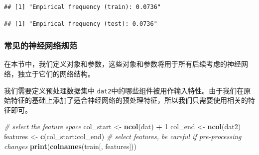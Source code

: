 \documentclass[
]{article}
\newenvironment{Shaded}{\begin{snugshade}}{\end{snugshade}}
\newcommand{\CommentTok}[1]{\textcolor[rgb]{0.56,0.35,0.01}{\textit{#1}}}
\newcommand{\DecValTok}[1]{\textcolor[rgb]{0.00,0.00,0.81}{#1}}
\newcommand{\FunctionTok}[1]{\textcolor[rgb]{0.13,0.29,0.53}{\textbf{#1}}}
\newcommand{\NormalTok}[1]{#1}
\newcommand{\OtherTok}[1]{\textcolor[rgb]{0.56,0.35,0.01}{#1}}
\newcommand{\SpecialCharTok}[1]{\textcolor[rgb]{0.81,0.36,0.00}{\textbf{#1}}}
\newcommand{\StringTok}[1]{\textcolor[rgb]{0.31,0.60,0.02}{#1}}
\begin{document}
\begin{Shaded}
\end{Shaded}

\begin{verbatim}
## [1] "Empirical frequency (train): 0.0736"
\end{verbatim}

\begin{Shaded}
\end{Shaded}

\begin{verbatim}
## [1] "Empirical frequency (test): 0.0736"
\end{verbatim}

\subsubsection{常见的神经网络规范}\label{ux5e38ux89c1ux7684ux795eux7ecfux7f51ux7edcux89c4ux8303}

在本节中，我们定义对象和参数，这些对象和参数将用于所有后续考虑的神经网络，独立于它们的网络结构。

我们需要定义预处理数据集中
\texttt{dat2}中的哪些组件被用作输入特性。由于我们在原始特征的基础上添加了适合神经网络的预处理特征，所以我们只需要使用相关的特征即可。

\begin{Shaded}
\begin{Highlighting}[]
\CommentTok{\# select the feature space}
\NormalTok{col\_start }\OtherTok{\textless{}{-}} \FunctionTok{ncol}\NormalTok{(dat) }\SpecialCharTok{+} \DecValTok{1}
\NormalTok{col\_end }\OtherTok{\textless{}{-}} \FunctionTok{ncol}\NormalTok{(dat2)}
\NormalTok{features }\OtherTok{\textless{}{-}} \FunctionTok{c}\NormalTok{(col\_start}\SpecialCharTok{:}\NormalTok{col\_end)  }\CommentTok{\# select features, be careful if pre{-}processing changes}
\FunctionTok{print}\NormalTok{(}\FunctionTok{colnames}\NormalTok{(train[, features]))}
\end{Highlighting}
\end{Shaded}
\end{document}
